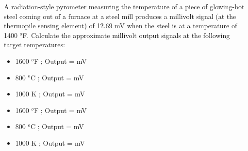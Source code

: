 

A radiation-style pyrometer measuring the temperature of a piece of glowing-hot steel coming out of a furnace at a steel mill produces a millivolt signal (at the thermopile sensing element) of 12.69 mV when the steel is at a temperature of 1400 $^{o}$F.  Calculate the approximate millivolt output signals at the following target temperatures:

\begin{itemize}
\item{} 1600 $^{o}$F ; Output = \underbar{\hskip 50pt} mV
\vskip 5pt
\item{} 800 $^{o}$C ; Output = \underbar{\hskip 50pt} mV
\vskip 5pt
\item{} 1000 K ; Output = \underbar{\hskip 50pt} mV
\end{itemize}







\begin{itemize}
\item{} 1600 $^{o}$F ; Output =  mV
\vskip 5pt
\item{} 800 $^{o}$C ; Output =  mV
\vskip 5pt
\item{} 1000 K ; Output =  mV
\end{itemize}












